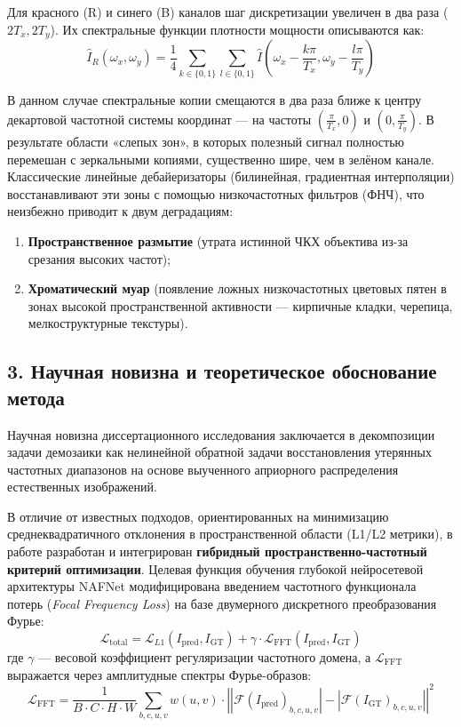 \documentclass[12pt,a4paper]{article}
\begin{document}
Для красного (R) и синего (B) каналов шаг дискретизации увеличен в два раза ($2T_x, 2T_y$). Их спектральные функции плотности мощности описываются как:
\begin{equation}
\hat{I}_R(\omega_x, \omega_y) = \frac{1}{4} \sum_{k \in \{0, 1\}} \sum_{l \in \{0, 1\}} \hat{I}\left(\omega_x - \frac{k\pi}{T_x}, \omega_y - \frac{l\pi}{T_y}\right)
\end{equation}

В данном случае спектральные копии смещаются в два раза ближе к центру декартовой частотной системы координат --- на частоты $\left(\frac{\pi}{T_x}, 0\right)$ и $\left(0, \frac{\pi}{T_y}\right)$. В результате области «слепых зон», в которых полезный сигнал полностью перемешан с зеркальными копиями, существенно шире, чем в зелёном канале. Классические линейные дебайеризаторы (билинейная, градиентная интерполяции) восстанавливают эти зоны с помощью низкочастотных фильтров (ФНЧ), что неизбежно приводит к двум деградациям:
\begin{enumerate}
    \item \textbf{Пространственное размытие} (утрата истинной ЧКХ объектива из-за срезания высоких частот);
    \item \textbf{Хроматический муар} (появление ложных низкочастотных цветовых пятен в зонах высокой пространственной активности --- кирпичные кладки, черепица, мелкоструктурные текстуры).
\end{enumerate}

\subsection*{3. Научная новизна и теоретическое обоснование метода}

Научная новизна диссертационного исследования заключается в декомпозиции задачи демозаики как нелинейной обратной задачи восстановления утерянных частотных диапазонов на основе выученного априорного распределения естественных изображений. 

В отличие от известных подходов, ориентированных на минимизацию среднеквадратичного отклонения в пространственной области (L1/L2 метрики), в работе разработан и интегрирован \textbf{гибридный пространственно-частотный критерий оптимизации}. Целевая функция обучения глубокой нейросетевой архитектуры NAFNet модифицирована введением частотного функционала потерь (\textit{Focal Frequency Loss}) на базе двумерного дискретного преобразования Фурье:
\begin{equation}
\mathcal{L}_{\text{total}} = \mathcal{L}_{L1}(I_{\text{pred}}, I_{\text{GT}}) + \gamma \cdot \mathcal{L}_{\text{FFT}}(I_{\text{pred}}, I_{\text{GT}})
\end{equation}
где $\gamma$ --- весовой коэффициент регуляризации частотного домена, а $\mathcal{L}_{\text{FFT}}$ выражается через амплитудные спектры Фурье-образов:
\begin{equation}
\mathcal{L}_{\text{FFT}} = \frac{1}{B \cdot C \cdot H \cdot W} \sum_{b,c,u,v} w(u,v) \cdot \left| \left| \mathcal{F}(I_{\text{pred}})_{b,c,u,v} \right| - \left| \mathcal{F}(I_{\text{GT}})_{b,c,u,v} \right| \right|^2
\end{equation}
\end{document}
